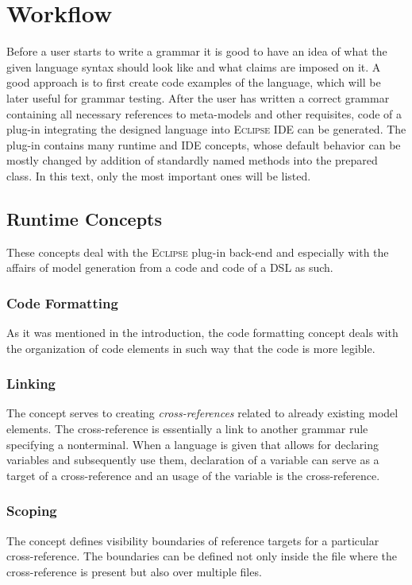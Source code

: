 \documentclass[12pt,notitlepage,a4paper]{report}
\begin{document}
\section {Workflow}
\label{WorkflowConcepts}
Before a user starts to write a grammar it is good to have an idea of what the given language syntax should look like and what claims are imposed on it. A good approach is to first create code examples of the language, which will be later useful for grammar testing. After the user has written a correct grammar containing all necessary references to meta-models and other requisites, code of a  plug-in integrating the designed language into \textsc{Eclipse IDE} can be generated. The plug-in contains many runtime and IDE concepts, whose default behavior can be mostly changed by addition of standardly named methods into the prepared class. In this text, only the most important ones will be listed.

\subsection{Runtime Concepts}

These concepts deal with the \textsc{Eclipse} plug-in back-end and especially with the affairs of model generation from a code and code of a DSL as such. 

\subsubsection{Code Formatting}{As it was mentioned in the introduction, the code formatting concept deals with the organization of code elements in such way that the code is more legible.}
\subsubsection{Linking}{The concept serves to creating \textit{cross-references} related to already existing model elements. The cross-reference is essentially a link to another grammar rule specifying a nonterminal. When a language is given that allows for declaring variables and subsequently use them, declaration of a variable can serve as a target of a cross-reference and an usage of the variable is the cross-reference.}

\subsubsection{Scoping}{The concept defines visibility boundaries of reference targets for a particular cross-reference. The boundaries can be defined not only inside the file where the cross-reference is present but also over multiple files.}
\end{document}

